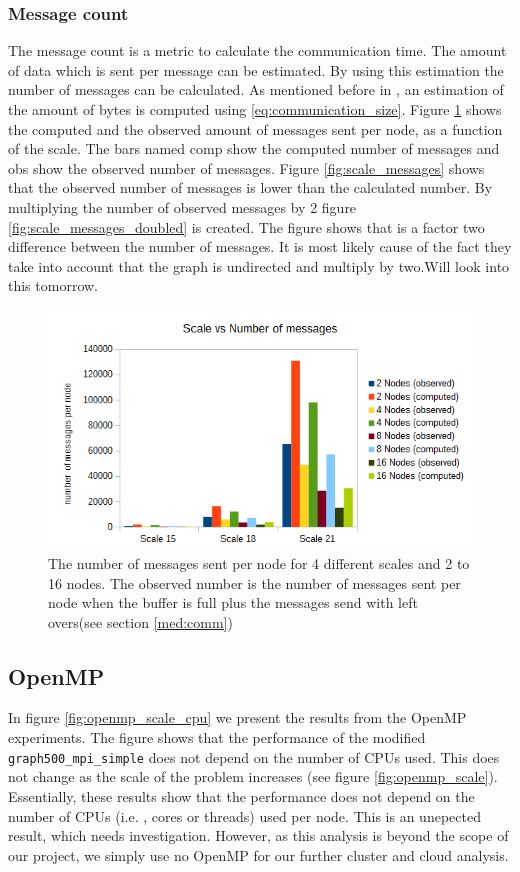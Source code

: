 \subsubsection{Message count}
The message count is a metric to calculate the communication time. The amount of data which is sent per message can be estimated. By using this estimation the number of messages can be calculated. As mentioned before in \cite{suzumura2011performance}, an estimation of the amount of bytes is computed using \ref{eq:communication_size}. Figure \ref{fig:das_scale_messages} shows the computed and the observed amount of messages sent per node, as a function of the scale. The bars named comp show the computed number of messages and obs show the observed number of messages. Figure \ref{fig:scale_messages} shows that the observed number of messages is lower than the calculated number. By multiplying the number of observed messages by 2 figure \ref{fig:scale_messages_doubled} is created. The figure shows that is a factor two difference between the number of messages. It is most likely cause of the fact they take into account that the graph is undirected and multiply by two.Will look into this tomorrow. 
\begin{figure}[!h]
\includegraphics[width=\linewidth]{images/scale_vs_messages.png}
\caption{The number of messages sent per node for 4 different scales and 2 to 16 nodes. The observed number is the number of messages sent per node when the buffer is full plus the messages send with left overs(see section \ref{med:comm})}
\label{fig:das_scale_messages}
\end{figure}


\subsection{OpenMP}
\label{sec:openmp}
In figure \ref{fig:openmp_scale_cpu} we present the results from the OpenMP experiments. 
The figure shows that the performance of the modified \texttt{graph500\_mpi\_simple} does not depend on the number of CPUs used. This does not change as the scale of the problem increases (see figure \ref{fig:openmp_scale}). Essentially, these results show that the performance does not depend on the number of CPUs (i.e. , cores or threads) used per node. This is an unepected result, which needs investigation. However, as this analysis is beyond the scope of our project, we simply use no OpenMP for our further cluster and cloud analysis. 

